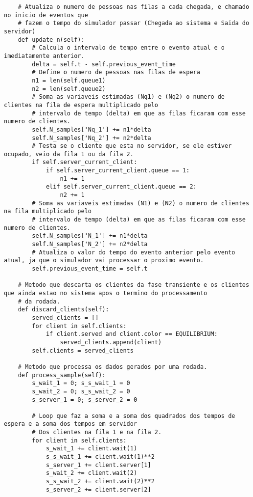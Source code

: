 \begin{lstlisting}
    # Atualiza o numero de pessoas nas filas a cada chegada, e chamado no inicio de eventos que
    # fazem o tempo do simulador passar (Chegada ao sistema e Saida do servidor)
    def update_n(self):
        # Calcula o intervalo de tempo entre o evento atual e o imediatamente anterior.
        delta = self.t - self.previous_event_time
        # Define o numero de pessoas nas filas de espera
        n1 = len(self.queue1)
        n2 = len(self.queue2)
        # Soma as variaveis estimadas (Nq1) e (Nq2) o numero de clientes na fila de espera multiplicado pelo
        # intervalo de tempo (delta) em que as filas ficaram com esse numero de clientes.
        self.N_samples['Nq_1'] += n1*delta
        self.N_samples['Nq_2'] += n2*delta
        # Testa se o cliente que esta no servidor, se ele estiver ocupado, veio da fila 1 ou da fila 2.
        if self.server_current_client:
            if self.server_current_client.queue == 1:
                n1 += 1
            elif self.server_current_client.queue == 2:
                n2 += 1
        # Soma as variaveis estimadas (N1) e (N2) o numero de clientes na fila multiplicado pelo
        # intervalo de tempo (delta) em que as filas ficaram com esse numero de clientes.
        self.N_samples['N_1'] += n1*delta
        self.N_samples['N_2'] += n2*delta
        # Atualiza o valor do tempo do evento anterior pelo evento atual, ja que o simulador vai processar o proximo evento.
        self.previous_event_time = self.t

    # Metodo que descarta os clientes da fase transiente e os clientes que ainda estao no sistema apos o termino do processamento
    # da rodada.
    def discard_clients(self):
        served_clients = []
        for client in self.clients:
            if client.served and client.color == EQUILIBRIUM:
                served_clients.append(client)
        self.clients = served_clients

    # Metodo que processa os dados gerados por uma rodada.
    def process_sample(self):
        s_wait_1 = 0; s_s_wait_1 = 0
        s_wait_2 = 0; s_s_wait_2 = 0
        s_server_1 = 0; s_server_2 = 0

        # Loop que faz a soma e a soma dos quadrados dos tempos de espera e a soma dos tempos em servidor
        # Dos clientes na fila 1 e na fila 2.
        for client in self.clients:
            s_wait_1 += client.wait(1)
            s_s_wait_1 += client.wait(1)**2
            s_server_1 += client.server[1]
            s_wait_2 += client.wait(2)
            s_s_wait_2 += client.wait(2)**2
            s_server_2 += client.server[2]
            

\end{lstlisting}
